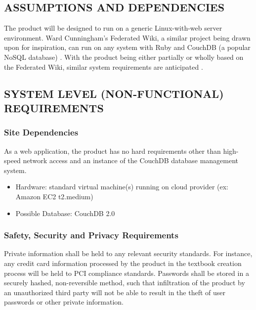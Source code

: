 \documentclass[letterpaper, 10pt, draftclsnofoot, compsoc, onecolumn]{IEEEtran}
\begin{document}
\subsection[ASSUMPTIONS AND DEPENDENCIES]{\rmfamily\bfseries\color{black} ASSUMPTIONS AND DEPENDENCIES}

{\noindent
The product will be designed to run on a generic Linux-with-web server environment.
Ward Cunningham's Federated Wiki, a similar project being drawn upon for inspiration, can run
on any system with Ruby and CouchDB (a popular NoSQL database) \cite{Federated}. 
With the product being either partially or wholly based on the Federated Wiki, similar system
requirements are anticipated \cite{Federated}.

\subsection[SYSTEM LEVEL (NON{}-FUNCTIONAL) REQUIREMENTS]{\rmfamily\bfseries\color{black} SYSTEM LEVEL (NON-FUNCTIONAL) REQUIREMENTS}


\subsubsection[Site Dependencies]{\rmfamily\bfseries\color{black} Site Dependencies}
As a web application, the product has no hard requirements other than high-speed
network access and an instance of the CouchDB database management system.
\begin{itemize}
  \item Hardware: standard virtual machine(s) running on cloud provider (ex: Amazon EC2 
  t2.medium)
  \item Possible Database: CouchDB 2.0
\end{itemize}

\subsubsection[Safety, Security and Privacy Requirements]{\rmfamily\bfseries\color{black} Safety, Security and Privacy Requirements}

{\noindent 
Private information shall be held to any relevant security standards. For instance,
any credit card information processed by the product in the textbook creation process
will be held to PCI compliance standards. Passwords shall be stored in a securely hashed,
non-reversible method, such that infiltration of the product by an unauthorized
third party will not be able to result in the theft of user passwords or other private
information.}

}
\end{document}
